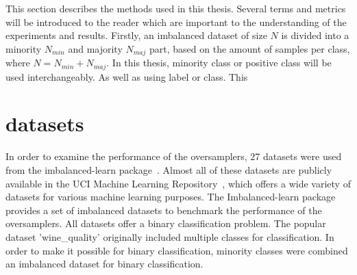 
This section describes the methods used in this thesis. Several terms and metrics will be introduced to the reader which are important to the understanding of the experiments and results. Firstly, an imbalanced dataset of size $N$ is divided into a minority $N_{min}$ and majority $N_{maj}$ part, based on the amount of samples per class, where $N = N_{min} + N_{maj}$. In this thesis, minority class or positive class will be used interchangeably. As well as using label or class. This 

\section{datasets}
In order to examine the performance of the oversamplers, 27 datasets were used from the imbalanced-learn package~\cite{Lemaitre2017Imbalanced-learn:Learning}. Almost all of these datasets are publicly available in the UCI Machine Learning Repository~\cite{Dua2017UCIRepository}, which offers a wide variety of datasets for various machine learning purposes. The Imbalanced-learn package provides a set of imbalanced datasets to benchmark the performance of the oversamplers. All datasets offer a binary classification problem. The popular dataset 'wine\_quality' originally included multiple classes for classification. In order to make it possible for binary classification, minority classes were combined an imbalanced dataset for binary classification.

